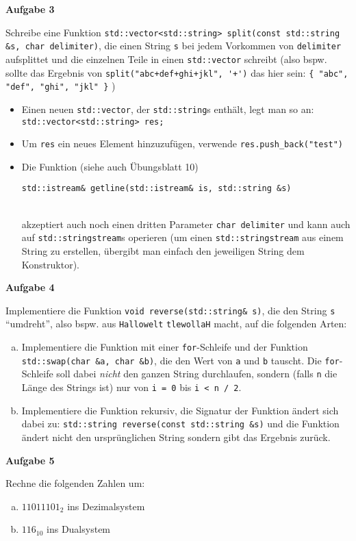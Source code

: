 \documentclass[a4paper,12pt]{article}
\newcommand{\Aufgabe}[1]{
  {
    \vspace*{0.5cm}
    \textsf{\textbf{Aufgabe #1}}
    \vspace*{0.2cm}
    
  }
}
\begin{document}
\Aufgabe{3} Schreibe eine Funktion \lstinline{std::vector<std::string> split(const std::string &s, char delimiter)}, die einen String
\lstinline{s} bei jedem Vorkommen von \lstinline{delimiter} aufsplittet und
die einzelnen Teile in einen \lstinline{std::vector} schreibt (also
bspw. sollte das Ergebnis von \lstinline|split("abc+def+ghi+jkl", '+')| das hier sein: \lstinline|{ "abc", "def", "ghi", "jkl" }| )
\begin{itemize}
\item Einen neuen \lstinline{std::vector}, der \lstinline{std::string}s enthält, legt man so an: \\
  \lstinline{std::vector<std::string> res;}
\item Um \lstinline{res} ein neues Element hinzuzufügen, verwende \lstinline{res.push_back("test")}
\item Die Funktion (siehe auch Übungsblatt 10) \\
  \centerline{ \lstinline{std::istream& getline(std::istream& is, std::string &s)} } \\
  akzeptiert auch noch einen dritten Parameter \lstinline{char delimiter} und kann auch auf \lstinline{std::stringstream}s operieren (um einen \lstinline{std::stringstream} aus einem String zu erstellen, übergibt man einfach den jeweiligen String dem Konstruktor).
\end{itemize}

\Aufgabe{4}
Implementiere die Funktion \lstinline{void reverse(std::string& s)}, die den String \lstinline{s} ``umdreht'', also bspw. aus \texttt{Hallowelt} \texttt{tlewollaH} macht, auf die folgenden Arten:
\begin{enumerate}[a)]
\item Implementiere die Funktion mit einer \texttt{for}-Schleife und der Funktion \lstinline{std::swap(char &a, char &b)}, die den Wert von \texttt{a} und \texttt{b} tauscht. Die \texttt{for}-Schleife soll dabei \emph{nicht} den ganzen String durchlaufen, sondern (falls \texttt{n} die Länge des Strings ist) nur von \lstinline{i = 0} bis \lstinline{i < n / 2}.
\item Implementiere die Funktion rekursiv, die Signatur der Funktion ändert sich dabei zu:
  \lstinline{std::string reverse(const std::string &s)} und die Funktion ändert nicht den ursprünglichen String sondern gibt das Ergebnis zurück.
\end{enumerate}

\Aufgabe{5}
Rechne die folgenden Zahlen um:
\begin{enumerate}[a)]
\item $11011101_2$ ins Dezimalsystem
\item $116_{10}$ ins Dualsystem
\end{enumerate}
\end{document}
